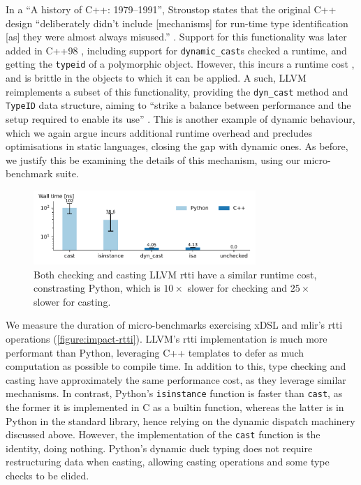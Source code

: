 In a ``A history of C++: 1979--1991'', Stroustop states that the original C++ design ``deliberately didn't include [mechanisms] for run-time type identification [as] they were almost always misused.'' \cite{stroustrupHistory197919911996}.
Support for this functionality was later added in C++98 \cite{internationalorganizationforstandardizationISOIEC148821998}, including support for \texttt{dynamic\_cast}s checked a runtime, and getting the \texttt{typeid} of a polymorphic object. However, this incurs a runtime cost \cite{goldthwaite2006technical}, and is brittle in the objects to which it can be applied. A such, LLVM reimplements a subset of this functionality, providing the \texttt{dyn\_cast} method and \texttt{TypeID} data structure, aiming to ``strike a balance between performance and the setup required to enable its use'' \cite{mlirteamMLIRIncludeMlir}.
This is another example of dynamic behaviour, which we again argue incurs additional runtime overhead and precludes optimisations in static languages, closing the gap with dynamic ones.
As before, we justify this be examining the details of this mechanism, using our micro-benchmark suite.

\begin{figure}[H]
    \centering
    \includegraphics[width=0.75\textwidth]{images/impact_dynamism/dynamic_cast.pdf}
    \caption{Both checking and casting LLVM \ac{rtti} have a similar runtime cost, constrasting Python, which is $10\times$ slower for checking and $25\times$ slower for casting.}
    \label{figure:impact-rtti}
\end{figure}

We measure the duration of micro-benchmarks exercising xDSL and \ac{mlir}'s \ac{rtti} operations (\autoref{figure:impact-rtti}). LLVM's \ac{rtti} implementation is much more performant than Python, leveraging C++ templates to defer as much computation as possible to compile time. In addition to this, type checking and casting have approximately the same performance cost, as they leverage similar mechanisms.
In contrast, Python's \texttt{isinstance} function is faster than \texttt{cast}, as the former it is implemented in C as a builtin function, whereas the latter is in Python in the standard library, hence relying on the dynamic dispatch machinery discussed above.
However, the implementation of the \texttt{cast} function is the identity, doing nothing. Python's dynamic duck typing \cite{milojkovicItsDuckTyping2017} does not require restructuring data when casting, allowing casting operations and some type checks to be elided.




